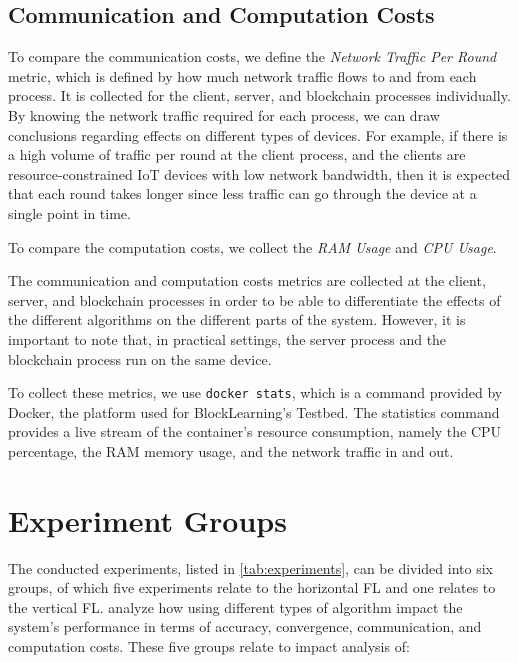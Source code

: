 \subsection{Communication and Computation Costs}

To compare the communication costs, we define the \textit{Network Traffic Per Round} metric, which is defined by how much network traffic flows to and from each process. It is collected for the client, server, and blockchain processes individually. By knowing the network traffic required for each process, we can draw conclusions regarding effects on different types of devices. For example, if there is a high volume of traffic per round at the client process, and the clients are resource-constrained IoT devices with low network bandwidth, then it is expected that each round takes longer since less traffic can go through the device at a single point in time.

To compare the computation costs, we collect the \textit{RAM Usage} and \textit{CPU Usage}. 

The communication and computation costs metrics are collected at the client, server, and blockchain processes in order to be able to differentiate the effects of the different algorithms on the different parts of the system. However, it is important to note that, in practical settings, the server process and the blockchain process run on the same device.

To collect these metrics, we use \texttt{docker stats}, which is a command provided by Docker, the platform used for BlockLearning's Testbed. The statistics command provides a live stream of the container's resource consumption, namely the CPU percentage, the RAM memory usage, and the network traffic in and out.

\section{Experiment Groups}\label{meth:experiments}

The conducted experiments, listed in \autoref{tab:experiments}, can be divided into six groups, of which five experiments relate to the horizontal FL and one relates to the vertical FL. analyze how using different types of algorithm impact the system's performance in terms of accuracy, convergence, communication, and computation costs. These five groups relate to impact analysis of:

